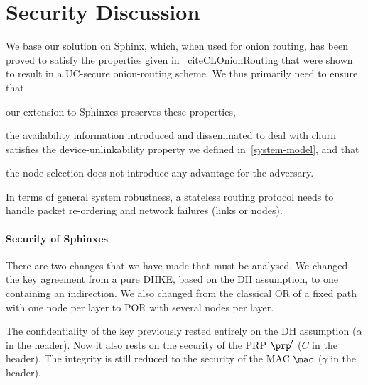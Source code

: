 \section{Security Discussion}%
\label{security-discussion}



We base our solution on Sphinx, which, when used for onion routing, has been proved to satisfy the
properties given in ~cite{CLOnionRouting} that were shown to result
in a UC-secure onion-routing scheme. We thus primarily need to ensure that 
\begin{enumerate*} \item our extension to Sphinxes preserves these
  properties, \item the availability information introduced and
  disseminated to deal with churn satisfies the device-unlinkability
  property we defined in~\cref{system-model}, and that \item the node
  selection does not introduce any advantage for the
  adversary. \end{enumerate*} In terms of general system robustness, a
stateless routing protocol needs to handle packet re-ordering and
network failures (links or nodes). 

\paragraph*{Security of Sphinxes}

There are two changes that we have made that must be analysed.
We changed the key agreement from a pure \ac{DHKE}, \ie based on the \ac{DH} 
assumption, to one containing an indirection.
We also changed from the classical \ac{OR} of a fixed path with one node per 
layer to \ac{POR} with several nodes per layer.

The confidentiality of the key previously rested entirely on the \ac{DH} 
assumption (\(\alpha\) in the header).
Now it also rests on the security of the \ac{PRP} \(\prp'\) (\(C\) in the 
header).
The integrity is still reduced to the security of the \ac{MAC} \(\mac\) 
(\(\gamma\) in the header).

